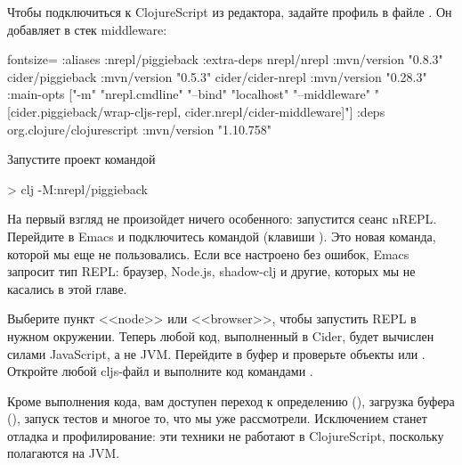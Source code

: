 \begin{figure}[H]
  \centering
  \resizebox{\columnwidth}{!}{}
  \label{fig:chart-repl-05}
\end{figure}

Чтобы подключиться к ClojureScript из редактора, задайте профиль  в файле . Он добавляет  в стек middleware:

\begin{english}
  \begin{clojure*}{fontsize=\small}
{:aliases
 {:nrepl/piggieback
  {:extra-deps
   {nrepl/nrepl {:mvn/version "0.8.3"}
    cider/piggieback {:mvn/version "0.5.3"}
    cider/cider-nrepl {:mvn/version "0.28.3"}}
   :main-opts
   ["-m" "nrepl.cmdline"
    "--bind" "localhost"
    "--middleware"
      "[cider.piggieback/wrap-cljs-repl,
        cider.nrepl/cider-middleware]"]}}
 :deps
 {org.clojure/clojurescript {:mvn/version "1.10.758"}}}
  \end{clojure*}
\end{english}

Запустите проект командой

\begin{english}
  \begin{bash}
> clj -M:nrepl/piggieback
  \end{bash}
\end{english}

На первый взгляд не произойдет ничего особенного: запустится сеанс nREPL. Перейдите в Emacs и подключитесь командой  (клавиши ). Это новая команда, которой мы еще не пользовались. Если все настроено без ошибок, Emacs запросит тип REPL: браузер, Node.js, shadow-clj и другие, которых мы не касались в этой главе.

Выберите пункт <<node>> или <<browser>>, чтобы запустить REPL в нужном окружении. Теперь любой код, выполненный в Cider, будет вычислен силами JavaScript, а не JVM. Перейдите в буфер  и проверьте объекты  или . Откройте любой cljs-файл и выполните код командами .

Кроме выполнения кода, вам доступен переход к определению (), загрузка буфера (), запуск тестов и многое то, что мы уже рассмотрели. Исключением станет отладка и профилирование: эти техники не работают в ClojureScript, поскольку полагаются на JVM.


